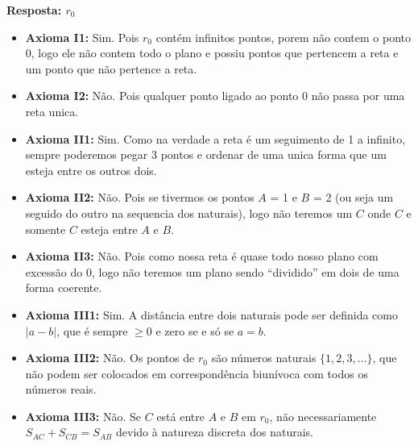 \documentclass[12pt,a4paper]{article}
\newcommand{\answer}[1]{\textcolor{answer}{#1}}
\begin{document}
\begin{enumerate}[label= (\roman*)]
        \answer{
            \textbf{Resposta: $r_0$}
            \begin{itemize}
                \item \textbf{Axioma I1:} Sim. Pois $r_0$ contém infinitos pontos, porem não contem o ponto $0$, logo ele não contem todo o plano e possiu pontos que pertencem a reta e um ponto que não pertence a reta.
                \item \textbf{Axioma I2:} Não. Pois qualquer ponto ligado ao ponto $0$ não passa por uma reta unica.
                \item \textbf{Axioma II1:} Sim. Como na verdade a reta é um seguimento de 1 a infinito, sempre poderemos pegar 3 pontos e ordenar de uma unica forma que um esteja entre os outros dois.
                \item \textbf{Axioma II2:} Não. Pois se tivermos os pontos $A$ = 1 e $B$ = 2 (ou seja um seguido do outro na sequencia dos naturais), logo não teremos um $C$ onde $C$ e somente $C$ esteja entre $A$ e $B$.
                \item \textbf{Axioma II3:} Não. Pois como nossa reta é quase todo nosso plano com excessão do 0, logo não teremos um plano sendo ``dividido'' em dois de uma forma coerente.
                \item \textbf{Axioma III1:} Sim. A distância entre dois naturais pode ser definida como $|a - b|$, que é sempre $\geq 0$ e zero se e só se $a = b$.
                \item \textbf{Axioma III2:} Não. Os pontos de $r_0$ são números naturais $\{1, 2, 3, \ldots\}$, que não podem ser colocados em correspondência biunívoca com todos os números reais.
                \item \textbf{Axioma III3:} Não. Se $C$ está entre $A$ e $B$ em $r_0$, não necessariamente $S_{AC} + S_{CB} = S_{AB}$ devido à natureza discreta dos naturais.
            \end{itemize} 
        }


\end{enumerate}
\end{document}
